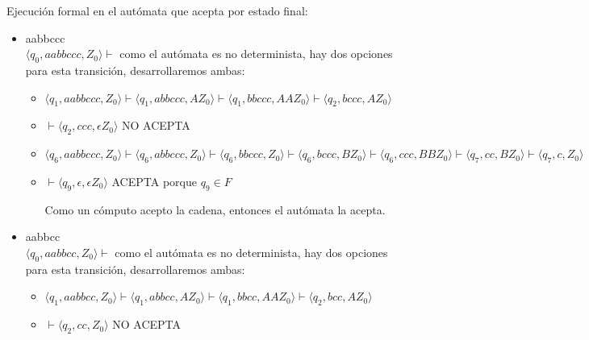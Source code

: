 \documentclass{article}
\begin{document}
\begin{enumerate}
{\begin{enumerate}
{        	Ejecución formal en el autómata que acepta por estado final:\\
        	\begin{itemize}
        		\item {
        		aabbccc\\
        		$\langle q_0, aabbccc, Z_0 \rangle \vdash$ como el autómata es no determinista, hay dos opciones para esta transición, desarrollaremos ambas:\\
        		
        		\begin{itemize}
        			\item {
        			$\langle q_1, aabbccc, Z_0 \rangle \vdash \langle q_1, abbccc, AZ_0 \rangle \vdash \langle q_1, bbccc, AAZ_0 \rangle \vdash  \langle q_2, bccc, AZ_0 \rangle$ 
        			}
        			\item {
        			$\vdash \langle q_2, ccc, \epsilon Z_0 \rangle$  NO ACEPTA\\
        			}
        		\end{itemize}
        	
        		\begin{itemize}
        			\item {
        				$\langle q_6, aabbccc, Z_0 \rangle \vdash \langle q_6, abbccc, Z_0 \rangle \vdash \langle q_6, bbccc, Z_0 \rangle \vdash  \langle q_6, bccc, BZ_0 \rangle \vdash  \langle q_6, ccc, BBZ_0 \rangle \vdash \langle q_7, cc, BZ_0 \rangle \vdash \langle q_7, c, Z_0 \rangle$ 
        			}
        			\item {
        			$\vdash \langle q_9, \epsilon, \epsilon Z_0 \rangle$ ACEPTA porque $q_9 \in F$\\
        			}
        		
        			Como un cómputo acepto la cadena, entonces el autómata la acepta.\\
        		\end{itemize}
        		
        		}
        		\item {
        		aabbcc\\
        		
        		$\langle q_0, aabbcc, Z_0 \rangle \vdash$ como el autómata es no determinista, hay dos opciones para esta transición, desarrollaremos ambas:\\
        		
        		\begin{itemize}
        			\item {
        				$\langle q_1, aabbcc, Z_0 \rangle \vdash \langle q_1, abbcc, AZ_0 \rangle \vdash \langle q_1, bbcc, AAZ_0 \rangle \vdash \langle q_2, bcc, AZ_0 \rangle $ 
        			}
        			\item {
        				$\vdash \langle q_2, cc, Z_0 \rangle$  NO ACEPTA\\
        			}
        		\end{itemize}
        		
}
\end{itemize}}
\end{enumerate}}
\end{enumerate}
\end{document}
